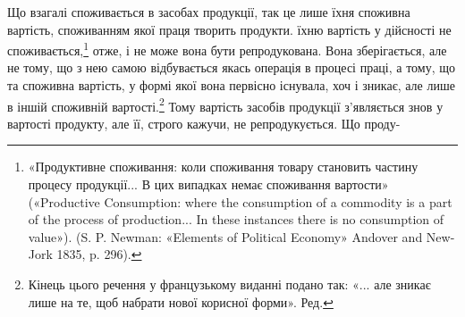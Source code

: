 Що взагалі споживається в засобах продукції, так це лише
їхня споживна вартість, споживанням якої праця творить продукти.
їхню вартість у дійсності не споживається,\footnote{
«Продуктивне споживання: коли споживання товару становить
частину процесу продукції... В цих випадках немає споживання вартости»
(«Productive Consumption: where the consumption of a commodity is a
part of the process of production... In these instances there is no consumption
of value»). (S. P. Newman: «Elements of Political Economy» Andover
and New-Jork 1835, p. 296).
} отже, і
не може вона бути репродукована. Вона зберігається, але не
тому, що з нею самою відбувається якась операція в процесі
праці, а тому, що та споживна вартість, у формі якої вона первісно
існувала, хоч і зникає, але лише в іншій споживній вартості.\footnote*{
Кінець цього речення у французькому виданні подано так: «... але
зникає лише на те, щоб набрати нової корисної форми». Ред.
}
Тому вартість засобів продукції з’являється знов у вартості
продукту, але її, строго кажучи, не репродукується. Що проду-